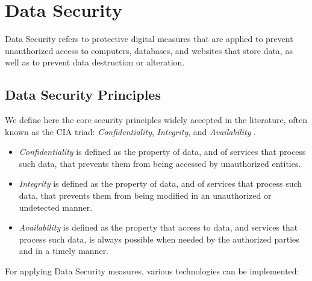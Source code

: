 
\section{Data Security} 
\label{sec:DataSecurity}


Data Security refers to protective digital measures that are applied to prevent unauthorized access to computers, databases, and websites that store data, as well as to prevent data destruction or alteration.


\subsection{Data Security Principles}
\label{ssec:DataProtectionGoals}


We define here the core security principles widely accepted in the literature, often known as the CIA triad: \textit{Confidentiality}, \textit{Integrity}, and \textit{Availability} \cite{Hansen2015}.

\begin{itemize}

    \item \textit{Confidentiality} is defined as the property of data, and of services that process such data, that prevents them from being accessed by unauthorized entities.

    \item \textit{Integrity} is defined as the property of data, and of services that process such data, that prevents them from being modified in an unauthorized or undetected manner.

    \item \textit{Availability} is defined as the property that access to data, and services that process such data, is always possible when needed by the authorized parties and in a timely manner.

\end{itemize}


For applying Data Security measures, various technologies can be implemented:

